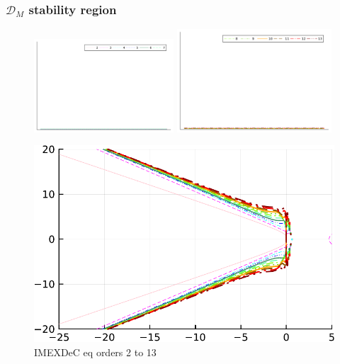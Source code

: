 \subsubsection*{$\mathcal{D}_M$ stability region}
\begin{figure}
	\centering
	\includegraphics[width=0.465\textwidth,trim={215 340 32 22}, clip]{pdf/odepics/colors_a-d_new_horiz_2-7_no_order.pdf}\!\!
	\includegraphics[width=0.515\textwidth,trim={179 340 30 22}, clip]{pdf/odepics/colors_a-d_new_horiz_8-13_no_order.pdf}\\
	\begin{minipage}[t]{0.32\textwidth}
		\centering
		\includegraphics[width=\textwidth, trim={0 0 0 0}, clip]{pdf/odepics/Minion_IMEXDeC_eq_ord13-crop.pdf}
		IMEXDeC eq orders 2 to 13
	\end{minipage}	
	\begin{minipage}[t]{0.32\textwidth}

\end{minipage}
\end{figure}
